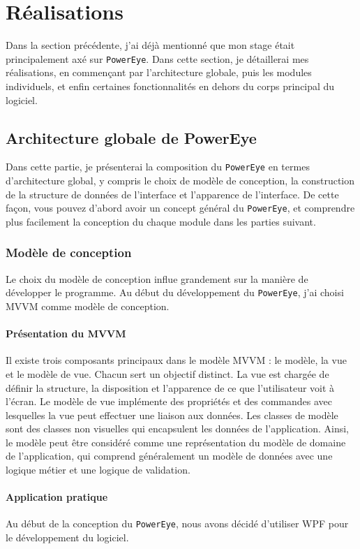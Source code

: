\chapter{Réalisations}
Dans la section précédente, j'ai déjà mentionné que mon stage était principalement axé sur \texttt{PowerEye}. Dans cette section, je détaillerai mes réalisations, en commençant par l'architecture globale, puis les modules individuels, et enfin certaines fonctionnalités en dehors du corps principal du logiciel.
\section{Architecture globale de PowerEye}
Dans cette partie, je présenterai la composition du \texttt{PowerEye} en termes d'architecture global, y compris le choix de modèle de conception, la construction de la structure de données de l'interface et l'apparence de l'interface. De cette façon, vous pouvez d'abord avoir un concept général du \texttt{PowerEye}, et comprendre plus facilement la conception du chaque module dans les parties suivant.
\subsection{Modèle de conception}
Le choix du modèle de conception influe grandement sur la manière de développer le programme. Au début du développement du \texttt{PowerEye}, j'ai choisi MVVM comme modèle de conception.
\subsubsection{Présentation du MVVM}
Il existe trois composants principaux dans le modèle MVVM : le modèle, la vue et le modèle de vue. Chacun sert un objectif distinct. La vue est chargée de définir la structure, la disposition et l’apparence de ce que l’utilisateur voit à l’écran. Le modèle de vue implémente des propriétés et des commandes avec lesquelles la vue peut effectuer une liaison aux données. Les classes de modèle sont des classes non visuelles qui encapsulent les données de l’application. Ainsi, le modèle peut être considéré comme une représentation du modèle de domaine de l’application, qui comprend généralement un modèle de données avec une logique métier et une logique de validation. \\
\subsubsection{Application pratique}
Au début de la conception du \texttt{PowerEye}, nous avons décidé d'utiliser \gls{WPF} pour le développement du logiciel. 
